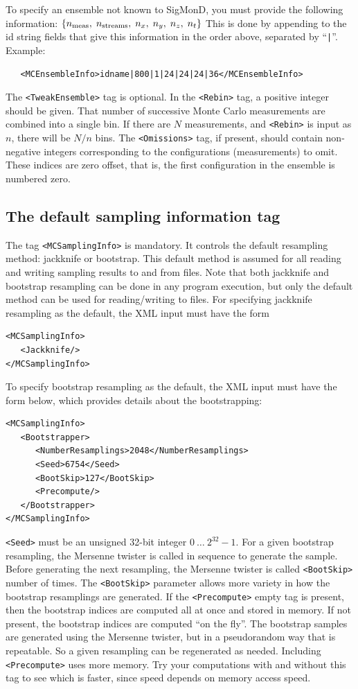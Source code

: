 \documentclass[12pt]{article}
\newcommand{\vb}{\texttt}
\begin{document}
To specify an ensemble not known to SigMonD, you must provide
the following information:
$\{n_{\rm meas}, \; n_{\rm streams}, \; n_x, \; n_y, \; n_z, \; n_t\}$
This is done by appending to the id string fields that give
this information in the order above, separated by ``\vb{|}''.
Example:
\begin{verbatim}
   <MCEnsembleInfo>idname|800|1|24|24|24|36</MCEnsembleInfo>
\end{verbatim}

The \vb{<TweakEnsemble>} tag is optional.
In the \vb{<Rebin>} tag, a positive integer should be given.  That number of
successive Monte Carlo measurements are combined into a single bin.
If there are $N$ measurements, and \vb{<Rebin>} is input as $n$,
there will be $N/n$ bins. The \vb{<Omissions>} tag, if present,
should contain non-negative integers corresponding to the configurations
(measurements) to omit. These indices are zero offset, that is, the
first configuration in the ensemble is numbered zero.

\subsection{The default sampling information tag}
The tag \vb{<MCSamplingInfo>} is mandatory.  It controls the default
resampling method:  jackknife or bootstrap.  This default method
is assumed for all reading and writing sampling results to and
from files.  Note that both jackknife and bootstrap resampling
can be done in any program execution, but only the default method can be used
for reading/writing to files.  For specifying jackknife resampling as
the default, the XML input must have the form
\begin{verbatim}
<MCSamplingInfo>
   <Jackknife/>
</MCSamplingInfo>
\end{verbatim}
To specify bootstrap resampling as the default, the XML input must have the
form below, which provides details about the bootstrapping:
\begin{verbatim}
<MCSamplingInfo>
   <Bootstrapper>
      <NumberResamplings>2048</NumberResamplings>
      <Seed>6754</Seed>
      <BootSkip>127</BootSkip>
      <Precompute/>
   </Bootstrapper>
</MCSamplingInfo>
\end{verbatim}
\vb{<Seed>} must be an unsigned 32-bit integer $0\ \dots\ 2^{32}-1$.
For a given bootstrap resampling, the Mersenne twister is
called in sequence to generate the sample. Before generating
the next resampling, the Mersenne twister is called \vb{<BootSkip>}
number of times. The \vb{<BootSkip>} parameter allows more variety
in how the bootstrap resamplings are generated. If the \vb{<Precompute>}
empty tag is present, then the bootstrap indices are computed all at once
and stored in memory. If not present, the bootstrap indices are computed
``on the fly''. The bootstrap samples are generated using the Mersenne
twister, but in a pseudorandom way that is repeatable. So a given resampling
can be regenerated as needed. Including \vb{<Precompute>} uses more memory.
Try your computations with and without this tag to see which is faster,
since speed depends on memory access speed.
\end{document}
